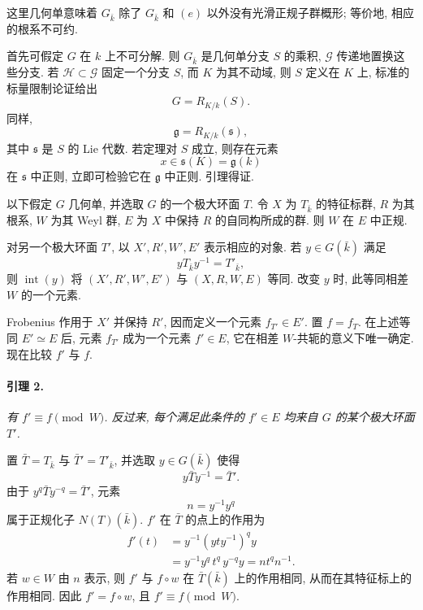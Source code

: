 这里几何单意味着 \(G_{\bar k}\) 除了 \(G_{\bar k}\) 和 \((e)\) 以外没有光滑正规子群概形; 等价地, 相应的根系不可约.

首先可假定 \(G\) 在 \(k\) 上不可分解. 则 \(G_{\bar k}\) 是几何单分支 \(S\) 的乘积, \(\mathcal G\) 传递地置换这些分支. 若 \(\mathcal H\subset\mathcal G\) 固定一个分支 \(S\), 而 \(K\) 为其不动域, 则 \(S\) 定义在 \(K\) 上, 标准的标量限制论证给出
\[
  G=R_{K/k}(S).
\]
同样,
\[
  \mathfrak g=R_{K/k}(\mathfrak s),
\]
其中 \(\mathfrak s\) 是 \(S\) 的 Lie 代数. 若定理对 \(S\) 成立, 则存在元素
\[
  x\in\mathfrak s(K)=\mathfrak g(k)
\]
在 \(\mathfrak s\) 中正则, 立即可检验它在 \(\mathfrak g\) 中正则. 引理得证.

以下假定 \(G\) 几何单, 并选取 \(G\) 的一个极大环面 \(T\). 令 \(X\) 为 \(T_{\bar k}\) 的特征标群, \(R\) 为其根系, \(W\) 为其 Weyl 群, \(E\) 为 \(X\) 中保持 \(R\) 的自同构所成的群. 则 \(W\) 在 \(E\) 中正规.

对另一个极大环面 \(T'\), 以 \(X',R',W',E'\) 表示相应的对象. 若 \(y\in G(\bar k)\) 满足
\[
  yT_{\bar k}y^{-1}=T'_{\bar k},
\]
则 \(\operatorname{int}(y)\) 将 \((X',R',W',E')\) 与 \((X,R,W,E)\) 等同. 改变 \(y\) 时, 此等同相差 \(W\) 的一个元素.

Frobenius 作用于 \(X'\) 并保持 \(R'\), 因而定义一个元素 \(f_{T'}\in E'\). 置 \(f=f_T\). 在上述等同 \(E'\simeq E\) 后, 元素 \(f_{T'}\) 成为一个元素 \(f'\in E\), 它在相差 \(W\)-共轭的意义下唯一确定. 现在比较 \(f'\) 与 \(f\).



\paragraph{\textbf{引理 2.}}
{\itshape 有 \(f'\equiv f\pmod W\). 反过来, 每个满足此条件的 \(f'\in E\) 均来自 \(G\) 的某个极大环面 \(T'\).}

置 \(\bar T=T_{\bar k}\) 与 \(\bar T'=T'_{\bar k}\), 并选取 \(y\in G(\bar k)\) 使得
\[
  y\bar T y^{-1}=\bar T'.
\]
由于 \(y^q\bar T y^{-q}=\bar T'\), 元素
\[
  n=y^{-1}y^q
\]
属于正规化子 \(N(T)(\bar k)\). \(f'\) 在 \(\bar T\) 的点上的作用为
\[
 \begin{aligned}
  f'(t)
    &=y^{-1}(yty^{-1})^q y\\
    &=y^{-1}y^q\,t^q\,y^{-q}y
      =nt^qn^{-1}.
 \end{aligned}
\]
若 \(w\in W\) 由 \(n\) 表示, 则 \(f'\) 与 \(f\circ w\) 在 \(\bar T(\bar k)\) 上的作用相同, 从而在其特征标上的作用相同. 因此 \(f'=f\circ w\), 且 \(f'\equiv f\pmod W\).

